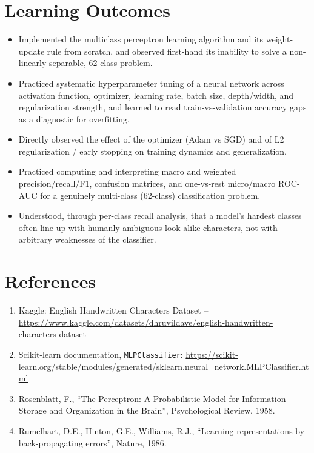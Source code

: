 \documentclass[12pt,a4paper]{article}
\begin{document}
\section{Learning Outcomes}
\begin{itemize}
\item Implemented the multiclass perceptron learning algorithm and its weight-update rule from
scratch, and observed first-hand its inability to solve a non-linearly-separable, 62-class problem.
\item Practiced systematic hyperparameter tuning of a neural network across activation function,
optimizer, learning rate, batch size, depth/width, and regularization strength, and learned to read
train-vs-validation accuracy gaps as a diagnostic for overfitting.
\item Directly observed the effect of the optimizer (Adam vs SGD) and of L2 regularization / early
stopping on training dynamics and generalization.
\item Practiced computing and interpreting macro and weighted precision/recall/F1, confusion
matrices, and one-vs-rest micro/macro ROC-AUC for a genuinely multi-class (62-class) classification
problem.
\item Understood, through per-class recall analysis, that a model's hardest classes often line up
with humanly-ambiguous look-alike characters, not with arbitrary weaknesses of the classifier.
\end{itemize}

\section{References}
\begin{enumerate}
\item Kaggle: English Handwritten Characters Dataset --
\url{https://www.kaggle.com/datasets/dhruvildave/english-handwritten-characters-dataset}
\item Scikit-learn documentation, \texttt{MLPClassifier}: \url{https://scikit-learn.org/stable/modules/generated/sklearn.neural_network.MLPClassifier.html}
\item Rosenblatt, F., ``The Perceptron: A Probabilistic Model for Information Storage and
Organization in the Brain'', Psychological Review, 1958.
\item Rumelhart, D.E., Hinton, G.E., Williams, R.J., ``Learning representations by back-propagating
errors'', Nature, 1986.
\end{enumerate}
\end{document}
